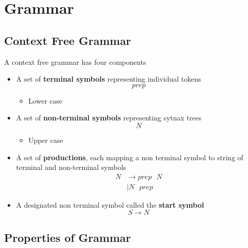 \chapter{Grammar}

\section{Context Free Grammar}

  A context free grammar has four components

  \begin{itemize}
    \item A set of \textbf{terminal symbols} representing individual tokens
    \begin{equation*}
      prep
    \end{equation*}
    \begin{itemize}
      \item Lower case
    \end{itemize}

    \item A set of \textbf{non-terminal symbols} representing sytnax trees
    \begin{equation*}
      N
    \end{equation*}
    \begin{itemize}
      \item Upper case
    \end{itemize}

    \item A set of \textbf{productions}, each mapping a non terminal symbol
    to string of terminal and non-terminal symbols
    \begin{align*}
      N &\to prep \text{ } N \\
      &\left| N \text{ } prep \right.
    \end{align*}

    \item A designated non terminal symbol called the \textbf{start symbol}
    \begin{equation}
      S \to N
    \end{equation}
  \end{itemize}

\section{Properties of Grammar}

